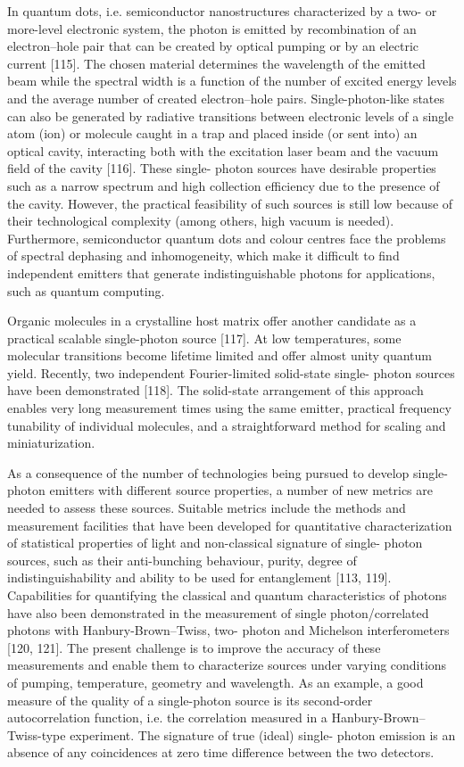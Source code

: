 			In quantum dots, i.e. semiconductor nanostructures characterized by a two- or more-level electronic system, the photon is emitted by recombination of an electron–hole pair that can be created by optical pumping or by an electric current [115]. The chosen material determines the wavelength of the emitted beam while the spectral width is a function of the number of excited energy levels and the average number of created electron–hole pairs.
			Single-photon-like states can also be generated by radiative transitions between electronic levels of a single atom (ion) or molecule caught in a trap and placed inside (or sent into) an optical cavity, interacting both with the excitation laser beam and the vacuum field of the cavity [116]. These single- photon sources have desirable properties such as a narrow spectrum and high collection efficiency due to the presence of the cavity. However, the practical feasibility of such sources is still low because of their technological complexity (among others, high vacuum is needed). Furthermore, semiconductor quantum dots and colour centres face the problems of spectral dephasing and inhomogeneity, which make it difficult to find independent emitters that generate indistinguishable photons for applications, such as quantum computing.

			Organic molecules in a crystalline host matrix offer another candidate as a practical scalable single-photon source [117]. At low temperatures, some molecular transitions become lifetime limited and offer almost unity quantum yield. Recently, two independent Fourier-limited solid-state single- photon sources have been demonstrated [118]. The solid-state arrangement of this approach enables very long measurement times using the same emitter, practical frequency tunability of individual molecules, and a straightforward method for scaling and miniaturization.

			As a consequence of the number of technologies being pursued to develop single-photon emitters with different source properties, a number of new metrics are needed to assess these sources. Suitable metrics include the methods and measurement facilities that have been developed for quantitative characterization of statistical properties of light and non-classical signature of single- photon sources, such as their anti-bunching behaviour, purity, degree of indistinguishability and ability to be used for entanglement [113, 119]. Capabilities for quantifying the classical and quantum characteristics of photons have also been demonstrated in the measurement of single photon/correlated photons with Hanbury-Brown–Twiss, two- photon and Michelson interferometers [120, 121].
			The present challenge is to improve the accuracy of these measurements and enable them to characterize sources under varying conditions of pumping, temperature, geometry and wavelength. As an example, a good measure of the quality of a single-photon source is its second-order autocorrelation function, i.e. the correlation measured in a Hanbury-Brown– Twiss-type experiment. The signature of true (ideal) single- photon emission is an absence of any coincidences at zero time difference between the two detectors.

